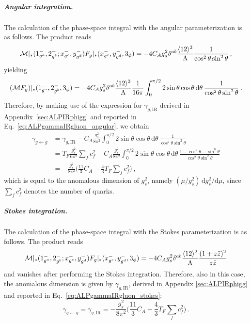\subparagraph{Angular integration.}
The calculation of the phase-space integral with the angular parameterization is as follows.
The product reads
\begin{equation}
    \mathcal M|_*(1^-_{g^a},2^-_{g^b};x^{-}_{g^c},y^{-}_{g^d})F_g|_*(x^{-}_{g^c},y^{-}_{g^d},3_\phi) = -4C_Ag_s^2 \delta^{ab} \frac{\langle 1 2 \rangle^2}{\Lambda} \frac{1}{\cos^2\theta \sin^2\theta}\,,
\end{equation}
yielding
\begin{equation}
    (\mathcal M F_g)|_*(1^-_{g^a},2^-_{g^b},3_\phi) = -4C_Ag_s^2 \delta^{ab} \frac{\langle 1 2 \rangle^2}{\Lambda} \frac{1}{16\pi}\int_0^{\pi/2}2 \sin\theta\cos\theta\,\text{d}\theta\, \frac{1}{\cos^2\theta \sin^2\theta}\,.
\end{equation}
Therefore, by making use of the expression for $\gamma_{g,\text{IR}}$ derived in
Appendix~\ref{sec:ALPIRphigg} and reported in Eq.~\eqref{eq:ALPgammaIRgluon_angular}, we obtain
\begin{align}
    \gamma_{g\leftarrow g} &= \gamma_{g,\text{IR}} - C_A\frac{g_s^2}{8\pi^2}  \int_0^{\pi/2}2\sin\theta\cos\theta \, \text{d}\theta \, \frac{1}{\cos^2\theta\sin^2\theta}\nonumber \\
    &= T_F\frac{g_s^2}{6\pi^2}\sum_f c_f^2 - C_A\frac{g_s^2}{8\pi^2}  \int_0^{\pi/2}2\sin\theta\cos\theta \, \text{d}\theta \, \frac{1 -\cos^8\theta- \sin^8\theta}{\cos^2\theta\sin^2\theta}\nonumber \\
    &= -\frac{g_s^2}{8\pi^2}\bigg(\frac{11}{3}C_A -\frac{4}{3}T_F\sum_fc_f^2\bigg)\,,
\end{align}
which is equal to the anomalous dimension of $g_s^2$, namely
$(\mu/g_s^2)\,\text{d}g_s^2/\text{d}\mu$, since $\sum_f c_f^2$ denotes the number of quarks.

\subparagraph{Stokes integration.}
The calculation of the phase-space integral with the Stokes parameterization is as follows.
The product reads
\begin{equation}
    \mathcal M|_*(1^-_{g^a},2^-_{g^b};x^{-}_{g^c},y^{-}_{g^d})F_g|_*(x^{-}_{g^c},y^{-}_{g^d},3_\phi) = -4C_Ag_s^2 \delta^{ab} \frac{\langle 1 2 \rangle^2}{\Lambda} \frac{(1+z\bar z)^2}{z\bar z }
\end{equation}
and vanishes after performing the Stokes integration.
Therefore, also in this case, the anomalous dimension is given by $\gamma_{g,\text{IR}}$,
derived in Appendix \ref{sec:ALPIRphigg} and reported in
Eq.\ \eqref{eq:ALPgammaIRgluon_stokes}:
\begin{equation}
    \gamma_{g\leftarrow g} = \gamma_{g,\text{IR}}
    = -\frac{g_s^2}{8\pi^2}\bigg(\frac{11}{3}C_A -\frac{4}{3}T_F\sum_fc_f^2\bigg)\,.
\end{equation}

